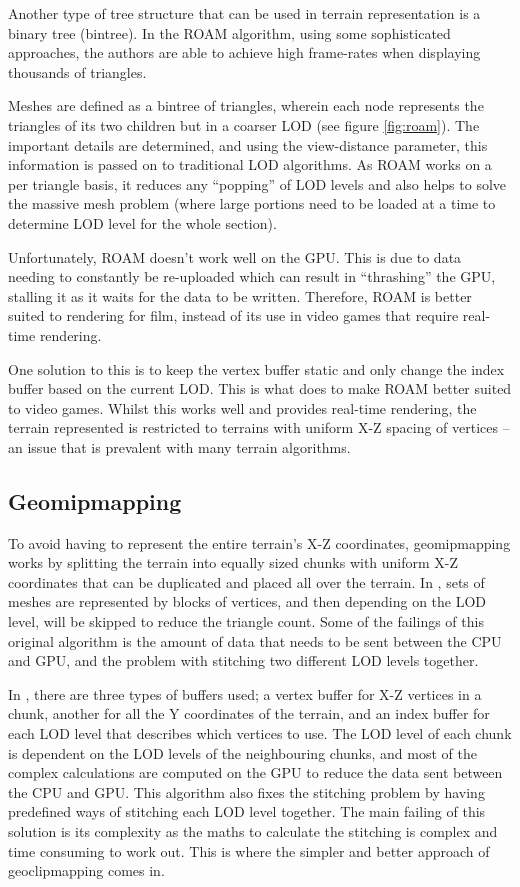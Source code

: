 \documentclass[notitlepage,12pt]{article}
\begin{document}
Another type of tree structure that can be used in terrain representation is a binary tree (bintree). In the ROAM algorithm, using some sophisticated approaches, the authors \cite{roam} are able to achieve high frame-rates when displaying thousands of triangles. 

Meshes are defined as a bintree of triangles, wherein each node represents the triangles of its two children but in a coarser LOD (see figure \ref{fig:roam}). The important details are determined, and using the view-distance parameter, this information is passed on to traditional LOD algorithms. As ROAM works on a per triangle basis, it reduces any ``popping'' of LOD levels and also helps to solve the massive mesh problem (where large portions need to be loaded at a time to determine LOD level for the whole section).

Unfortunately, ROAM doesn't work well on the GPU. This is due to data needing to constantly be re-uploaded which can result in ``thrashing'' the GPU, stalling it as it waits for the data to be written. Therefore, ROAM is better suited to rendering for film, instead of its use in video games that require real-time rendering.

One solution to this is to keep the vertex buffer static and only change the index buffer based on the current LOD. This is what \cite{roamGeomancy} does to make ROAM better suited to video games. Whilst this works well and provides real-time rendering, the terrain represented is restricted to terrains with uniform X-Z spacing of vertices -- an issue that is prevalent with many terrain algorithms.

\subsection{Geomipmapping}

To avoid having to represent the entire terrain's X-Z coordinates, geomipmapping works by splitting the terrain into equally sized chunks with uniform X-Z coordinates that can be duplicated and placed all over the terrain. In \cite{geomipmapping}, sets of meshes are represented by blocks of vertices, and then depending on the LOD level, will be skipped to reduce the triangle count. Some of the failings of this original algorithm is the amount of data that needs to be sent between the CPU and GPU, and the problem with stitching two different LOD levels together.

In \cite{geomipmappingScape}, there are three types of buffers used; a vertex buffer for X-Z vertices in a chunk, another for all the Y coordinates of the terrain, and an index buffer for each LOD level that describes which vertices to use. The LOD level of each chunk is dependent on the LOD levels of the neighbouring chunks, and most of the complex calculations are computed on the GPU to reduce the data sent between the CPU and GPU. This algorithm also fixes the stitching problem by having predefined ways of stitching each LOD level together. The main failing of this solution is its complexity as the maths to calculate the stitching is complex and time consuming to work out. This is where the simpler and better approach of geoclipmapping comes in.
\end{document}
